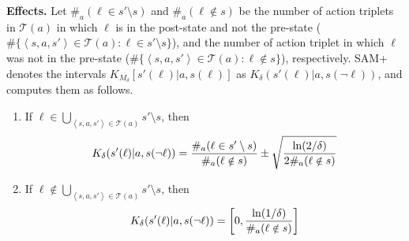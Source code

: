 \documentclass[letterpaper]{article} %
\newcommand{\tuple}[1]{\ensuremath{\left \langle #1 \right \rangle }}
\begin{document}
\noindent \textbf{Effects.} 
Let $\#_a(\ell\in s'\setminus s)$ and $\#_a(\ell\notin s)$ 
be the number of action triplets in $\mathcal{T}(a)$ in which $\ell$ is in the post-state and not the pre-state ($\#\{\tuple{s, a, s'}\in \mathcal{T}(a):\ell\in s'\setminus s\}$), 
and the number of action triplet in which $\ell$ was not in the pre-state 
($\#\{\tuple{s, a, s'}\in \mathcal{T}(a):\ell\notin s\}$), respectively. 
SAM+ denotes the intervals $K_{M_\delta}[s'(\ell)|a,s(\ell)]$ 
as $K_\delta(s'(\ell)|a,s(\neg \ell))$, and computes them as follows.
\begin{enumerate}
    \item If $\ell \in \bigcup_{\tuple{s, a, s'}\in \mathcal{T}(a)} s'\setminus s$, 
then 
\begin{equation}
\small
    K_\delta(s'(\ell)|a,s(\neg \ell)) = \frac{\#_a(\ell\in s'\setminus s)}{\#_a(\ell\notin s)} \pm\sqrt{\frac{\ln(2/\delta)}{2\#_a(\ell\notin s)}}
    \label{eq:present-effects}
\end{equation}
\item If $\ell\notin\bigcup_{\tuple{s, a, s'}\in \mathcal{T}(a)} s'\setminus s$, then 
\begin{equation}
\small
    K_\delta(s'(\ell)|a,s(\neg \ell)) = \left[0,\frac{\ln(1/\delta)}{\#_a(\ell\notin s)}\right]
    \label{eq:missing-effects}
\end{equation}
\end{enumerate}



\end{document}
